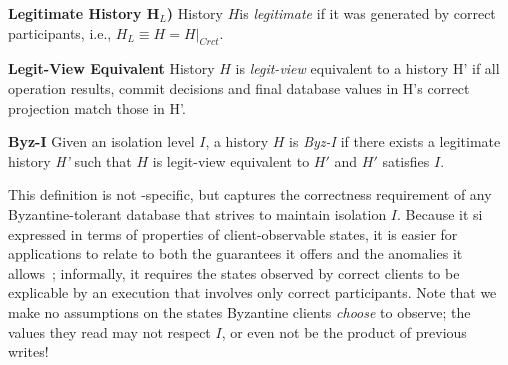 \par\textbf{Legitimate History H$_L$)} History $H$is \textit{legitimate} if it was generated by correct participants, i.e., $H_L \equiv H = H|_{Crct}$.

\par\textbf{Legit-View Equivalent} History $H$ is \textit{legit-view} equivalent to a history H' if all operation results, commit decisions and final database values in H's correct projection match those in H'.



\par \textbf{Byz-I} Given  an isolation level $I$,
a history $H$ is \textit{Byz-I} if there exists a legitimate history \textit{H'} such that $H$ is legit-view equivalent to $H'$ and $H'$ satisfies $I$.


This definition is not \sys-specific, but captures the correctness requirement of any Byzantine-tolerant database that strives to maintain isolation $I$. Because it si  expressed in terms of properties of client-observable states, it is easier for applications to relate to both the guarantees it offers and the anomalies it allows~\cite{crooks17seeing}; informally, it requires the states observed by correct clients to be explicable by an execution that involves only correct participants.  Note that we make no assumptions on the states  Byzantine clients \textit{choose} to observe; the values they read may not respect $I$, or even not be the product of previous writes!


